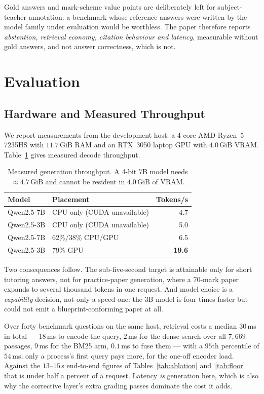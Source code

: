 \documentclass[conference]{IEEEtran}
\begin{document}
Gold answers and mark-scheme value points are deliberately left for
subject-teacher annotation: a benchmark whose reference answers were written by
the model family under evaluation would be worthless. The paper therefore
reports \emph{abstention, retrieval economy, citation behaviour and latency},
measurable without gold answers, and not answer correctness, which is not.

\section{Evaluation}
\subsection{Hardware and Measured Throughput}
\label{sec:latency}
We report measurements from the development host: a $4$-core
AMD Ryzen~5 7235HS with $11.7$\,GiB RAM and an RTX~3050 laptop GPU with
$4.0$\,GiB VRAM. Table~\ref{tab:throughput} gives measured decode throughput.

\begin{table}[htbp]
\caption{Measured generation throughput. A 4-bit $7$B model needs
$\approx 4.7$\,GiB and cannot be resident in $4.0$\,GiB of VRAM.}
\label{tab:throughput}
\centering
\begin{tabular}{llr}
\toprule
\textbf{Model} & \textbf{Placement} & \textbf{Tokens/s} \\
\midrule
Qwen2.5-7B & CPU only (CUDA unavailable) & 4.7 \\
Qwen2.5-3B & CPU only (CUDA unavailable) & 5.0 \\
Qwen2.5-7B & 62\%/38\% CPU/GPU & 6.5 \\
Qwen2.5-3B & 79\% GPU & \textbf{19.6} \\
\bottomrule
\end{tabular}
\end{table}

Two consequences follow. The sub-five-second target is attainable only for
short tutoring answers, not for practice-paper generation, where a $70$-mark
paper expands to several thousand tokens in one request. And model choice is a
\emph{capability} decision, not only a speed one: the $3$B model is four times
faster but could not emit a blueprint-conforming paper at all.

Over forty
benchmark questions on the same host, retrieval costs a median $30$\,ms in
total --- $18$\,ms to encode the query, $2$\,ms for the dense search over all
$7{,}669$ passages, $9$\,ms for the BM25 arm, $0.1$\,ms to fuse them --- with a
$95$th percentile of $54$\,ms; only a process's first query pays more, for the
one-off encoder load. Against the $13$--$15$\,s end-to-end figures of
Tables~\ref{tab:ablation} and~\ref{tab:floor} that is under half a percent of a
request. Latency \emph{is} generation here, which is also why the corrective
layer's extra grading passes dominate the cost it adds.
\end{document}
